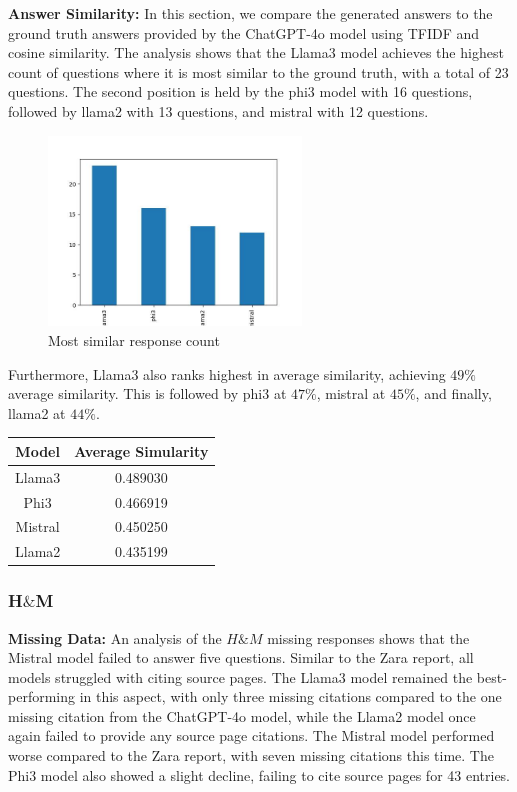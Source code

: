 \documentclass[]{article}
\begin{document}
\textbf{Answer Similarity:} 
In this section, we compare the generated answers to the ground truth answers provided by the ChatGPT-4o model using TFIDF and
cosine similarity.
The analysis shows that the Llama3 model achieves the highest count of questions where it is most similar to the ground truth, with a total of 23 questions.
The second position is held by the phi3 model with 16 questions, followed by llama2 with 13 questions, and mistral with 12 questions.

\begin{figure}[H]
    \centering
    \includegraphics[width=0.6\textwidth]{./images/highest_count_zara.jpg}
    \caption{Most similar response count}
    \label{fig:image_label}
\end{figure}

Furthermore, Llama3 also ranks highest in average similarity, achieving $49\%$ average similarity. This is followed by phi3 at $47\%$, mistral at $45\%$, and finally, llama2 at $44\%$.

\begin{center}
    \begin{tabular}{||c c||} 
     \hline
     \textbf{Model} & \textbf{Average Simularity}  \\ [0.5ex] 
     \hline
     Llama3 & 0.489030 \\ 
     \hline
     Phi3 & 0.466919  \\
     \hline
     Mistral & 0.450250 \\ 
     \hline
     Llama2 & 0.435199  \\
     \hline
    \end{tabular}
\end{center}
    

\subsubsection{H$\&$M}
\textbf{Missing Data:} An analysis of the $H\&M$ missing responses shows that the Mistral model failed to answer 
five questions. Similar to the Zara report, 
all models struggled with citing source pages. 
The Llama3 model remained the best-performing in this aspect, with only three missing citations compared to the one missing citation from the ChatGPT-4o model,
while the Llama2 model once again failed to provide any source page citations. 
The Mistral model performed worse compared to the Zara report, 
with seven missing citations this time. 
The Phi3 model also showed a slight decline, failing to cite source pages for 43 entries.
\newline\newline
\end{document}
